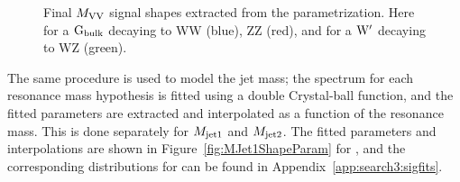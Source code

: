 \begin{figure}[h!]
\centering
{}
\caption{Final $M_{\rm VV}$ signal shapes extracted from the parametrization. Here for a $\mathrm{G}_\mathrm{bulk}$ decaying to WW (blue), ZZ (red), and for a $\mathrm{W}^\prime$ decaying to WZ (green).}
\label{fig:MVVfromjson}
\end{figure}
The same procedure is used to model the jet mass; the \MJ spectrum for each resonance mass hypothesis is fitted using a double Crystal-ball function, and the fitted parameters are extracted and interpolated as a function of the resonance mass. This is done separately for $M_{\rm jet1}$ and $M_{\rm jet2}$. The fitted parameters and interpolations are shown in Figure~\ref{fig:MJet1ShapeParam} for \MJO, and the corresponding distributions for \MJT can be found in Appendix~\ref{app:search3:sigfits}.
